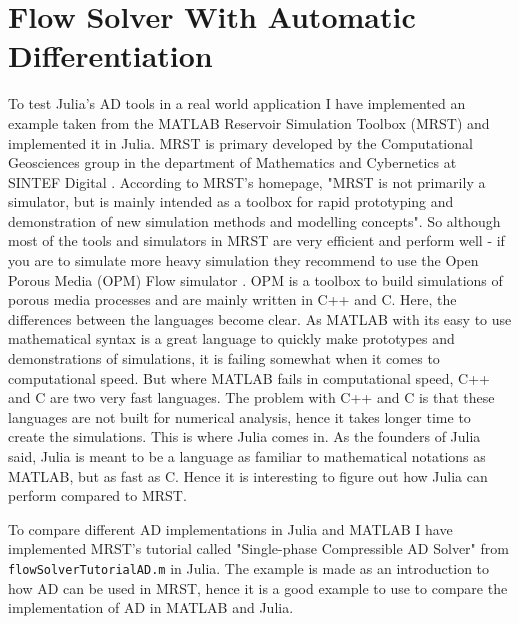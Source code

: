 \section{Flow Solver With Automatic Differentiation}
\label{sec:FlowSolver}
To test Julia's AD tools in a real world application I have implemented an example taken from the MATLAB Reservoir Simulation Toolbox (MRST) and implemented it in Julia. MRST is primary developed by the Computational Geosciences group in the department of Mathematics and Cybernetics at SINTEF Digital \emph{\cite{mrstHomepage}}. According to MRST's homepage, "MRST is not primarily a simulator, but is mainly intended as a toolbox for rapid prototyping and demonstration of new simulation methods and modelling concepts". So although most of the tools and simulators in MRST are very efficient and perform well - if you are to simulate more heavy simulation they recommend to use the Open Porous Media (OPM) Flow simulator \emph{\citep{OPM}}. OPM is a toolbox to build simulations of porous media processes and are mainly written in C++ and C. Here, the differences between the languages become clear. As MATLAB with its easy to use mathematical syntax is a great language to quickly make prototypes and demonstrations of simulations, it is failing somewhat when it comes to computational speed. But where MATLAB fails in computational speed, C++ and C are two very fast languages. The problem with C++ and C is that these languages are not built for numerical analysis, hence it takes longer time to create the simulations. This is where Julia comes in. As the founders of Julia said, Julia is meant to be a language as familiar to mathematical notations as MATLAB, but as fast as C. Hence it is interesting to figure out how Julia can perform compared to MRST.

To compare different AD implementations in Julia and MATLAB I have implemented MRST's tutorial called "Single-phase Compressible AD Solver" from \texttt{flowSolverTutorialAD.m} \emph{\citep{flowSolverADExample}} in Julia. The example is made as an introduction to how AD can be used in MRST, hence it is a good example to use to compare the implementation of AD in MATLAB and Julia. 

